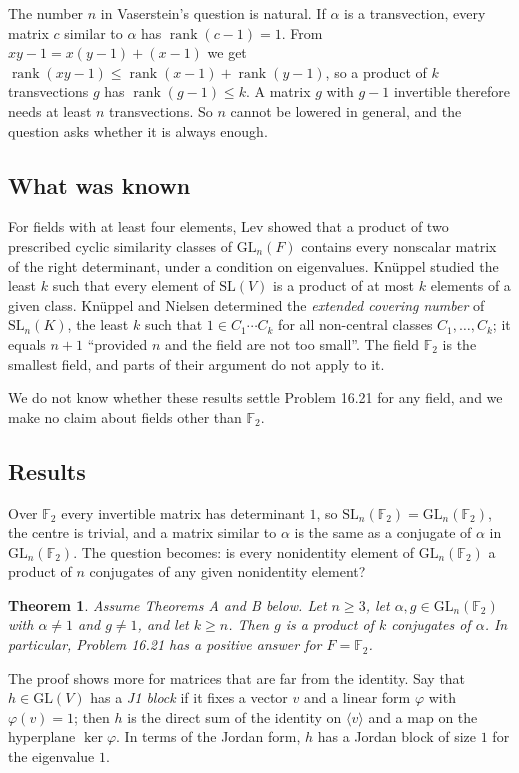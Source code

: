 \documentclass[11pt]{amsart}
\newtheorem{mainthm}{Theorem}
\theoremstyle{definition}
\theoremstyle{remark}
\newcommand{\F}{\mathbb{F}_2}
\newcommand{\GL}{\mathrm{GL}}
\newcommand{\SL}{\mathrm{SL}}
\newcommand{\rk}{\operatorname{rank}}
\begin{document}
The number $n$ in Vaserstein's question is natural. If $\alpha$ is a transvection, every matrix
$c$ similar to $\alpha$ has $\rk(c-1)=1$. From $xy-1=x(y-1)+(x-1)$ we get
$\rk(xy-1)\le\rk(x-1)+\rk(y-1)$, so a product of $k$ transvections $g$ has $\rk(g-1)\le k$. A
matrix $g$ with $g-1$ invertible therefore needs at least $n$ transvections. So $n$ cannot be
lowered in general, and the question asks whether it is always enough.

\subsection{What was known}
For fields with at least four elements, Lev \cite{Lev} showed that a product of two prescribed
cyclic similarity classes of $\GL_n(F)$ contains every nonscalar matrix of the right determinant,
under a condition on eigenvalues. Kn\"uppel \cite{Knuppel} studied the least $k$ such that every
element of $\SL(V)$ is a product of at most $k$ elements of a given class. Kn\"uppel and Nielsen
\cite{KN} determined the \emph{extended covering number} of $\SL_n(K)$, the least $k$ such that
$1\in C_1\cdots C_k$ for all non-central classes $C_1,\dots,C_k$; it equals $n+1$ ``provided $n$
and the field are not too small''. The field $\F$ is the smallest field, and parts of their
argument do not apply to it.

We do not know whether these results settle Problem 16.21 for any field, and we make no claim
about fields other than $\F$.

\subsection{Results}
Over $\F$ every invertible matrix has determinant $1$, so $\SL_n(\F)=\GL_n(\F)$, the centre is
trivial, and a matrix similar to $\alpha$ is the same as a conjugate of $\alpha$ in $\GL_n(\F)$.
The question becomes: is every nonidentity element of $\GL_n(\F)$ a product of $n$ conjugates of
any given nonidentity element?

\begin{mainthm}\label{thm:main}
Assume Theorems A and B below. Let $n\ge3$, let $\alpha,g\in\GL_n(\F)$ with $\alpha\ne1$ and
$g\ne1$, and let $k\ge n$. Then $g$ is a product of $k$ conjugates of $\alpha$. In particular,
Problem 16.21 has a positive answer for $F=\F$.
\end{mainthm}

The proof shows more for matrices that are far from the identity. Say that $h\in\GL(V)$ has a
\emph{J1 block} if it fixes a vector $v$ and a linear form $\varphi$ with $\varphi(v)=1$; then $h$
is the direct sum of the identity on $\langle v\rangle$ and a map on the hyperplane $\ker\varphi$.
In terms of the Jordan form, $h$ has a Jordan block of size $1$ for the eigenvalue $1$.
\end{document}
